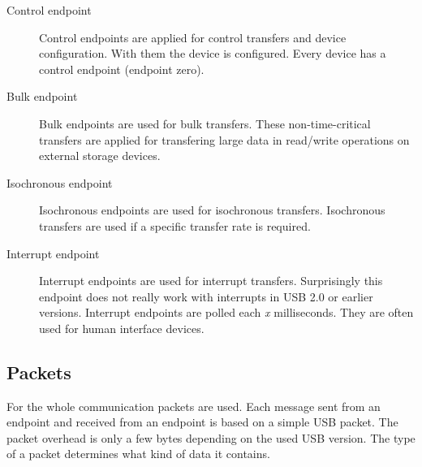 \documentclass{acm_proc_article-sp}
\begin{document}
\begin{description}
\item[Control endpoint]
Control endpoints are applied for control transfers and device configuration.
With them the device is configured.
Every device has a control endpoint (endpoint zero). \cite{usb}\cite{beyond}

\item[Bulk endpoint]
Bulk endpoints are used for bulk transfers.
These non-time-critical transfers are applied for transfering large data
in read/write operations on external storage devices. \cite{usb}\cite{beyond}

\item[Isochronous endpoint]
Isochronous endpoints are used for isochronous transfers.
Isochronous transfers are used if a specific transfer rate is required. \cite{usb}\cite{beyond}

\item[Interrupt endpoint]
Interrupt endpoints are used for interrupt transfers.
Surprisingly this endpoint does not really work with interrupts in USB 2.0 or earlier versions.
Interrupt endpoints are polled each \emph{x} milliseconds.
They are often used for human interface devices. \cite{usb}\cite{beyond}

\end{description}

\subsection{Packets}
For the whole communication packets are used.
Each message sent from an endpoint and received from an endpoint is based on a simple USB packet.
The packet overhead is only a few bytes depending on the used USB version.
The type of a packet determines what kind of data it contains.
\end{document}
